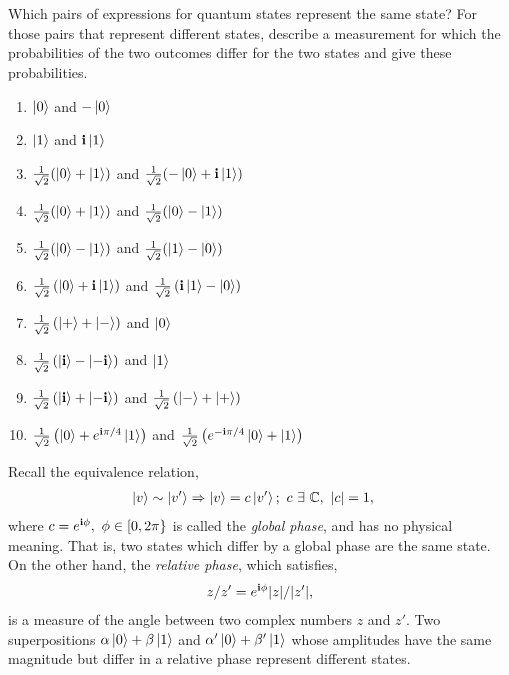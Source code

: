 \section{}

Which pairs of expressions for quantum states represent the same state?
For those pairs that represent different states, describe a measurement
for which the probabilities of the two outcomes differ for the two states
and give these probabilities.

\begin{multicols}{2}
\begin{enumerate}[label=\alph*.,ref={Ex.~\thesection\alph*}]
        \item $\ket{0}$ and $-\ket{0}$
        \item $\ket{1}$ and $\mathbf{i} \ket{1}$
        \item $\tfrac{1}{\sqrt{2}} (\ket{0} + \ket{1})$ and $\tfrac{1}{\sqrt{2}} (-\ket{0} + \mathbf{i} \ket{1})$
        \item $\tfrac{1}{\sqrt{2}} (\ket{0} + \ket{1})$ and $\tfrac{1}{\sqrt{2}} (\ket{0} - \ket{1})$
        \item $\tfrac{1}{\sqrt{2}} (\ket{0} - \ket{1})$ and $\tfrac{1}{\sqrt{2}} (\ket{1} - \ket{0})$
        \item $\tfrac{1}{\sqrt{2}} \left ( \ket{0} +\mathbf{i} \ket{1} \right )$ and $\tfrac{1}{\sqrt{2}} \left (\mathbf{i} \ket{1} - \ket{0} \right )$
        \item $\tfrac{1}{\sqrt{2}} \left ( \ket{+} + \ket{-} \right )$ and $\ket{0}$
        \item $\tfrac{1}{\sqrt{2}} \left ( \ket{\mathbf{i}} - \ket{-\mathbf{i}} \right )$ and $\ket{1}$
        \item $\tfrac{1}{\sqrt{2}} \left ( \ket{\mathbf{i}} + \ket{-\mathbf{i}} \right )$ and $\tfrac{1}{\sqrt{2}} \left ( \ket{-} + \ket{+} \right )$
        \item $\tfrac{1}{\sqrt{2}} \left ( \ket{0} + e^{\mathbf{i} \pi / 4} \ket{1} \right )$ and $\tfrac{1}{\sqrt{2}} \left (e^{- \mathbf{i} \pi / 4} \ket{0} + \ket{1} \right )$
    \end{enumerate}
\end{multicols}

\hypertarget{sol:2p2}{{\Sol}}
Recall the equivalence relation,
\begin{align}
\label{eqn:globalphase}
    \ket{v} \sim \ket{v'} \Rightarrow \ket{v} &= c \ket{v'};~c~\exists~\mathbb{C},~|c| = 1,
\end{align}
where $c = e^{\mathbf{i} \phi},~\phi \in [0, 2 \pi\}$ is called the \textit{global phase}, and has no physical meaning.
That is, two states which differ by a global phase are the same state.
On the other hand, the \textit{relative phase}, which satisfies,
\begin{align}
\label{eqn:relativephase}
    z/z' = e^{\mathbf{i} \phi} |z|/|z'|,
\end{align}
is a measure of the angle between two complex numbers $z$ and $z'$.
Two superpositions $\alpha \ket{0} + \beta \ket{1}$ and
$\alpha' \ket{0} + \beta' \ket{1}$ whose amplitudes have the same magnitude but differ
in a relative phase represent different states.

